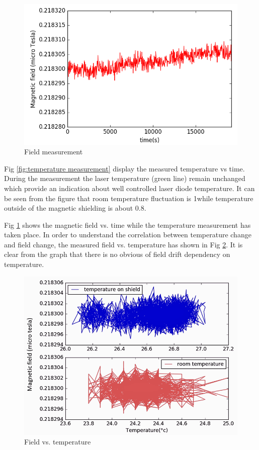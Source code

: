   \begin{figure}[h]
\centering\includegraphics[width=0.8\linewidth]{figures/field_.png}
\caption{Field measurement\label{fig:field}}
\end{figure}

 Fig \ref{fig:temperature measurement} display the measured temperature vs time.  During the measurement the laser temperature (green line) remain  unchanged which provide an indication about well controlled laser diode temperature.  It can be seen from the figure that room temperature fluctuation is 1\degree while temperature outside of the magnetic shielding is about 0.8\degree. 
 
 Fig \ref{fig:field} shows the magnetic field vs. time while the temperature measurement has taken place. In order to understand the correlation between temperature change and field change, the measured field vs. temperature has shown in Fig \ref{fig:field_vs_temp}. It is clear from the graph that there is no obvious of field drift dependency on temperature.
  
 \begin{figure}[h]
\centering\includegraphics[width=0.6\linewidth]{figures/field_vs_temp.png}
\caption{Field vs. temperature\label{fig:field_vs_temp}}
\end{figure}
 
